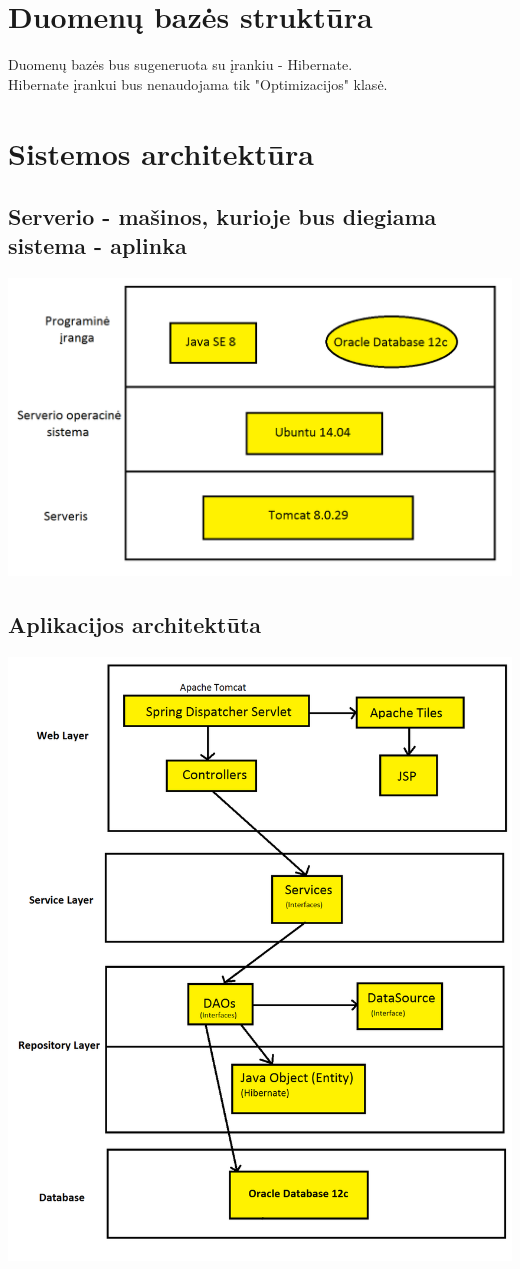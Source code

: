 \documentclass[a4paper,12pt]{article}
\begin{document}
\section{Duomenų bazės struktūra}
Duomenų bazės bus sugeneruota su įrankiu - Hibernate.\\
Hibernate įrankui bus nenaudojama tik "Optimizacijos" klasė.


\section{Sistemos architektūra}
\subsection{Serverio - mašinos, kurioje bus diegiama sistema - aplinka}
\includegraphics[scale=0.5]{architektura1}
\subsection{Aplikacijos architektūta}
\includegraphics[scale=0.5]{architektura2}
\end{document}
